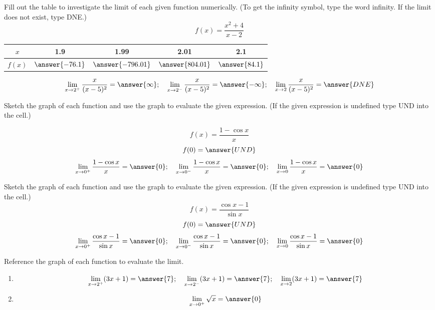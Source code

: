 \documentclass{ximera}
\begin{document}
\begin{problem}\label{prob:240hom1prob2b}   
Fill out the table to investigate the limit of each given function numerically.  (To get the infinity symbol, type the word infinity. If the limit does not exist, type DNE.)
    $$f(x)=\frac{x^2+4}{x-2}$$
    \begin{center}
    \begin{tabular}{|c|c|c|c|c|}
         $x$ & 1.9 & 1.99 & 2.01 & 2.1  \\
         \hline
         $f(x)$ & $\answer{-76.1}$ & $\answer{-796.01}$ & $\answer{804.01}$ & $\answer{84.1}$ 
    \end{tabular}
    \end{center}
    $$\lim_{x\to 2^+}\frac{x}{(x-5)^2}=\answer{\infty};\quad \lim_{x\to 2^-}\frac{x}{(x-5)^2}=\answer{-\infty};\quad \lim_{x\to 2}\frac{x}{(x-5)^2}=\answer{DNE}$$

\end{problem}

\begin{problem}\label{prob:240hom1prob3}
Sketch the graph of each function and use the graph to evaluate the given expression.  (If the given expression is undefined type UND into the cell.)
 
       $$f(x)=\frac{1-\cos x}{x}$$
       $$f(0)=\answer{UND}$$
       $$\lim_{x\to 0^+}\frac{1-\cos x}{x}=\answer{0};\quad \lim_{x\to 0^-}\frac{1-\cos x}{x}=\answer{0};\quad \lim_{x\to 0}\frac{1-\cos x}{x}=\answer{0}$$
       
\end{problem}

\begin{problem}\label{prob:240hom1prob3b}
Sketch the graph of each function and use the graph to evaluate the given expression.  (If the given expression is undefined type UND into the cell.)
       $$f(x)=\frac{\cos x-1}{\sin x}$$
       $$f(0)=\answer{UND}$$
       $$\lim_{x\to 0^+}\frac{\cos x-1}{\sin x}=\answer{0};\quad \lim_{x\to 0^-}\frac{\cos x-1}{\sin x}=\answer{0};\quad \lim_{x\to 0}\frac{\cos x-1}{\sin x}=\answer{0}$$
        
 
\end{problem}

\begin{problem}\label{prob:240hom1prob4}
Reference the graph of each function to evaluate the limit.
\begin{enumerate}
    \item $$\lim_{x\to 2^+}(3x+1)=\answer{7};\quad \lim_{x\to 2^-}(3x+1)=\answer{7};\quad \lim_{x\to 2}(3x+1)=\answer{7}$$
    \item $$\lim_{x\to 0^+}\sqrt{x}=\answer{0}$$
\end{enumerate}
   
 
\end{problem}
\end{document}

